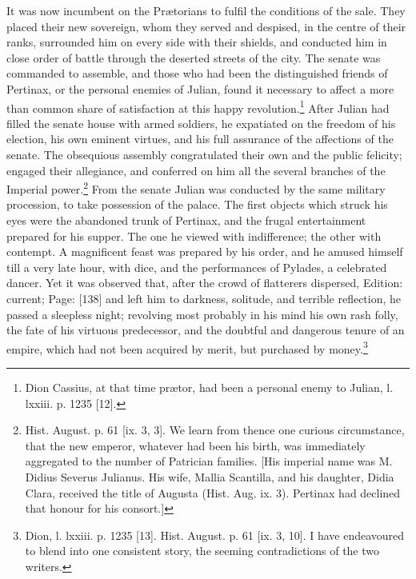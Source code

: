 It was now incumbent on the Prætorians to fulfil the conditions of the sale. They placed their new sovereign, whom they served and despised, in the centre of their ranks, surrounded him on every side with their shields, and conducted him in close order of battle through the deserted streets of the city. The senate was commanded to assemble, and those who had been the distinguished friends of Pertinax, or the personal enemies of Julian, found it necessary to affect a more than common share of satisfaction at this happy revolution.\footnote{Dion Cassius, at that time prætor, had been a personal enemy to Julian, l. lxxiii. p. 1235 [12].} After Julian had filled the senate house with armed soldiers, he expatiated on the freedom of his election, his own eminent virtues, and his full assurance of the affections of the senate. The obsequious assembly congratulated their own and the public felicity; engaged their allegiance, and conferred on him all the several branches of the Imperial power.\footnote{Hist. August. p. 61 [ix. 3, 3]. We learn from thence one curious circumstance, that the new emperor, whatever had been his birth, was immediately aggregated to the number of Patrician families. [His imperial name was M. Didius Severus Julianus. His wife, Mallia Scantilla, and his daughter, Didia Clara, received the title of Augusta (Hist. Aug. ix. 3). Pertinax had declined that honour for his consort.]} From the senate Julian was conducted by the same military procession, to take possession of the palace. The first objects which struck his eyes were the abandoned trunk of Pertinax, and the frugal entertainment prepared for his supper. The one he viewed with indifference; the other with contempt. A magnificent feast was prepared by his order, and he amused himself till a very late hour, with dice, and the performances of Pylades, a celebrated dancer. Yet it was observed that, after the crowd of flatterers dispersed, Edition: current; Page: [138] and left him to darkness, solitude, and terrible reflection, he passed a sleepless night; revolving most probably in his mind his own rash folly, the fate of his virtuous predecessor, and the doubtful and dangerous tenure of an empire, which had not been acquired by merit, but purchased by money.\footnote{Dion, l. lxxiii. p. 1235 [13]. Hist. August. p. 61 [ix. 3, 10]. I have endeavoured to blend into one consistent story, the seeming contradictions of the two writers.}

